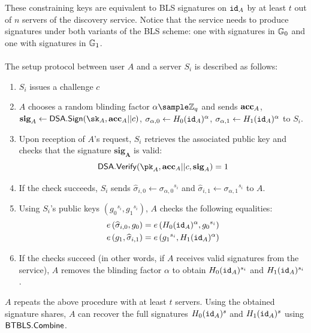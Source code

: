 		\noindent These constraining keys are equivalent to BLS signatures on $\mathtt{id}_A$ by at least $t$ out of $n$ servers of the discovery service. Notice that the service needs to produce signatures under both variants of the BLS scheme: one with signatures in $\mathbb{G}_0$ and one with signatures in $\mathbb{G}_1$.
		
		
		\paragraph{} The setup protocol between user $A$ and a server $S_i$ is described as follows:
		\begin{enumerate}
			\item $S_i$ issues a challenge $c$
			\item $A$ chooses a random blinding factor $\alpha \sample \mathbb{Z}_q$ and sends $\mathbf{acc}_A$, $\mathbf{sig}_A \leftarrow \SIG.\Sign(\sk_A, \acc_A || c)$, $\sigma_{\alpha,0} \leftarrow H_0(\mathtt{id}_A)^\alpha$, $\sigma_{\alpha,1} \leftarrow H_1(\mathtt{id}_A)^\alpha$ to $S_i$.
			\item Upon reception of $A$'s request, $S_i$ retrieves the associated public key and checks that the signature $\mathbf{sig_A}$ is valid:
			\begin{equation}
				\SIG.\Verif(\pk_A, \acc_A||c, \mathbf{sig}_A) = 1
			\end{equation}
		\item If the check succeeds, $S_i$ sends $\widehat\sigma_{i,0} \leftarrow {\sigma_{\alpha,0}}^{s_i}$ and $\widehat\sigma_{i,1} \leftarrow {\sigma_{\alpha,1}}^{s_i}$ to $A$.
		\item Using $S_i$'s public keys $({g_0}^{s_i}, {g_1}^{s_i})$, $A$ checks the following equalities:
		\begin{align}
			\label{eq:usercheck0}
			e\left(\widehat\sigma_{i,0}, g_0 \right) &= e\left(H_0(\mathtt{id}_A)^\alpha, {g_0}^{s_i} \right) \\
			\label{eq:usercheck1}
			e\left(g_1, \widehat\sigma_{i,1} \right) &= e\left({g_1}^{s_i}, H_1(\mathtt{id}_A)^\alpha \right)
		\end{align}
		\item If the checks succeed (in other words, if $A$ receives valid signatures from the service), $A$ removes the blinding factor $\alpha$ to obtain $H_0(\mathtt{id}_A)^{s_i}$ and $H_1(\mathtt{id}_A)^{s_i}$.
		\end{enumerate}
		
	
	\noindent $A$ repeats the above procedure with at least $t$ servers. Using the obtained signature shares, $A$ can recover the full signatures $H_0(\mathtt{id}_A)^s$ and $H_1(\mathtt{id}_A)^s$ using $\mathsf{BTBLS}.\mathsf{Combine}$.
	
